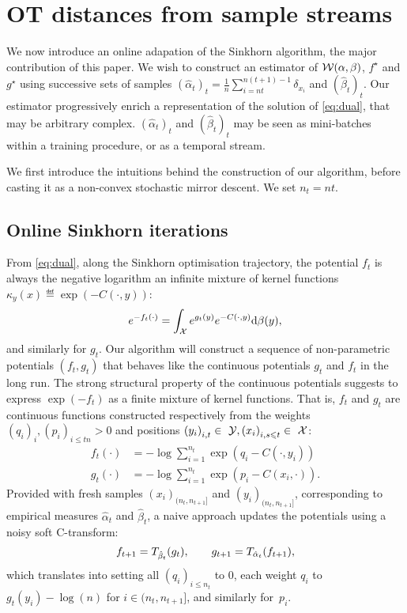 
\section{OT distances from sample streams}

We now introduce an online adapation of the Sinkhorn algorithm, the major
contribution of this paper. We wish to construct an estimator of
$\Ww(\alpha,\beta)$, $f^\star$ and $g^\star$ using successive sets of samples
$(\hat \alpha_t)_t = \frac{1}{n} \sum_{i=nt}^{n(t+1) - 1} \delta_{x_i}$ and
${(\hat \beta_t)}_t$. Our estimator progressively enrich a representation of the
solution of \eqref{eq:dual}, that may be arbitrary complex. $(\hat \alpha_t)_t$
and $(\hat \beta_t)_t$ may be seen as mini-batches within a training procedure,
or as a temporal stream. 

We first introduce the intuitions behind the construction of our algorithm,
before casting it as a non-convex stochastic mirror descent. We set $n_t = nt$.

\subsection{Online Sinkhorn iterations}

From \eqref{eq:dual}, along the Sinkhorn optimisation trajectory, the potential $f_t$ is always the negative logarithm an
infinite mixture of kernel functions $\kappa_y(x) \eqdef \exp(-C(\cdot, y))$:
\begin{equation*}
    e^{-f_t(\cdot)} = 
    \int_{\Xx} e^{g_t(y)}  e^{-C(\cdot, y)} \d \beta(y),
\end{equation*}
and similarly for $g_t$. Our algorithm will construct a sequence of
non-parametric potentials $(f_t, g_t)$ that behaves like the continuous
potentials $g_t$ and $f_t$ in the long run. The strong structural property of
the continuous potentials suggests to express
$\exp(-f_t)$ as a finite mixture of kernel functions.
That is, $f_t$ and $g_t$ are continuous functions constructed
respectively from the weights ${(q_i)}_{i}, {(p_i)}_{i \leq tn} > 0$ and
positions ${(y_i)}_{i,t} \in~\Yy, {(x_i)}_{i,s\leq t} \in~\Xx$:
\begin{align}\label{eq:param}
    f_t(\cdot) &= - \log \sum_{i=1}^{n_t} 
    \exp(q_i - C(\cdot, y_i)) \\
    g_t(\cdot) &= - \log \sum_{i=1}^{n_t}
    \exp(p_i - C(x_i, \cdot)).
\end{align}
Provided with fresh samples $(x_i)_{(n_t, n_{t+1}]}$ and $(y_i)_{(n_t, n_{t+1}]}$, 
corresponding to empirical measures $\hat \alpha_t$ and $\hat \beta_t$, a naive approach
 updates the potentials using a noisy soft C-transform:
\begin{equation}\label{eq:updates}
     f_{t+1} = \Ctrans{g_t}{\hat \beta_t},
    \qquad g_{t+1} = \Ctrans{f_{t+1}}{\hat \alpha_t},
\end{equation}
which translates into setting all $(q_i)_{i \leq n_t}$ to $0$, each weight
 $q_i$ to $g_t(y_i) - \log(n)$ for $i \in (n_t, n_{t+1}]$, and similarly for~$p_i$.

